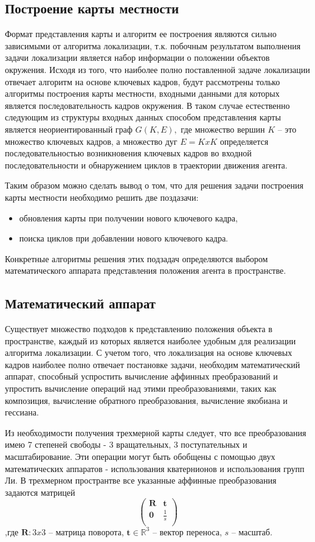 \subsection{Построение карты местности}
Формат представления карты и алгоритм ее построения являются сильно зависимыми от алгоритма локализации, т.к. побочным результатом выполнения задачи локализации является набор информации о положении объектов окружения. Исходя из того, что наиболее полно поставленной задаче локализации отвечает алгоритм на основе ключевых кадров, будут рассмотрены только алгоритмы построения карты местности, входными данными для которых является последовательность кадров окружения. В таком случае естественно следующим из структуры входных данных способом представления карты является неориентированный граф $G(K, E),$ где множество вершин $K$ -- это множество ключевых кадров, а множество дуг $E = K x K$ определяется последовательностью возникновения ключевых кадров во входной последовательности и обнаружением циклов в траектории движения агента.


Таким образом можно сделать вывод о том, что для решения задачи построения карты местности необходимо решить две поздазачи:
\begin{itemize}
    \item обновления карты при получении нового ключевого кадра,
    \item поиска циклов при добавлении нового ключевого кадра.
\end{itemize}


Конкретные алгоритмы решения этих подзадач определяются выбором математического аппарата представления положения агента в пространстве.


\subsection{Математический аппарат}
Существует множество подходов к представлению положения объекта в пространстве, каждый из которых является наиболее удобным для реализации алгоритма локализации. С учетом того, что локализация на основе ключевых кадров наиболее полно отвечает постановке задачи, необходим математический аппарат, способный успростить вычисление аффинных преобразований и упростить вычисление операций над этими преобразованиями, таких как композиция, вычисление обратного преобразования, вычисление якобиана и гессиана.


Из необходимости получения трехмерной карты следует, что все преобразования имею 7 степеней свободы - 3 вращательных, 3 поступательных и масштабирование. Эти операции могут быть обобщены с помощью двух математических аппаратов - использования кватернионов и использования групп Ли. В трехмерном пространтве все указанные аффинные преобразования задаются матрицей
\begin{equation}
    \begin{pmatrix}
    \mathbf{R} & \mathbf{t}  \\
    \mathbf{0} & \frac{1}{s} \\
    \end{pmatrix}
\end{equation}
,где $\mathbf{R}: 3x3$ -- матрица поворота, $\mathbf{t} \in \mathbb{R}^3$ -- вектор переноса, $s$ -- масштаб.


